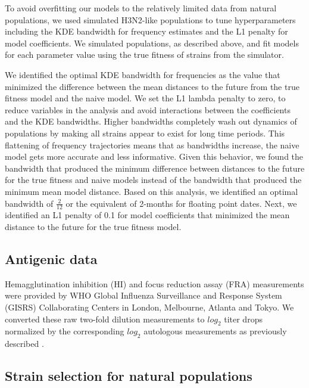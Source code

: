 To avoid overfitting our models to the relatively limited data from natural populations, we used simulated H3N2-like populations to tune hyperparameters including the KDE bandwidth for frequency estimates and the L1 penalty for model coefficients.
We simulated populations, as described above, and fit models for each parameter value using the true fitness of strains from the simulator.

We identified the optimal KDE bandwidth for frequencies as the value that minimized the difference between the mean distances to the future from the true fitness model and the naive model.
We set the L1 lambda penalty to zero, to reduce variables in the analysis and avoid interactions between the coefficients and the KDE bandwidths.
Higher bandwidths completely wash out dynamics of populations by making all strains appear to exist for long time periods.
This flattening of frequency trajectories means that as bandwidths increase, the naive model gets more accurate and less informative.
Given this behavior, we found the bandwidth that produced the minimum difference between distances to the future for the true fitness and naive models instead of the bandwidth that produced the minimum mean model distance.
Based on this analysis, we identified an optimal bandwidth of $\frac{2}{12}$ or the equivalent of 2-months for floating point dates.
Next, we identified an L1 penalty of 0.1 for model coefficients that minimized the mean distance to the future for the true fitness model.

\subsection*{Antigenic data}

Hemagglutination inhibition (HI) and focus reduction assay (FRA) measurements were provided by WHO Global Influenza Surveillance and Response System (GISRS) Collaborating Centers in London, Melbourne, Atlanta and Tokyo.
We converted these raw two-fold dilution measurements to $log_{2}$ titer drops normalized by the corresponding $log_{2}$ autologous measurements as previously described \cite{Neher:2016hy}.

\subsection*{Strain selection for natural populations}

